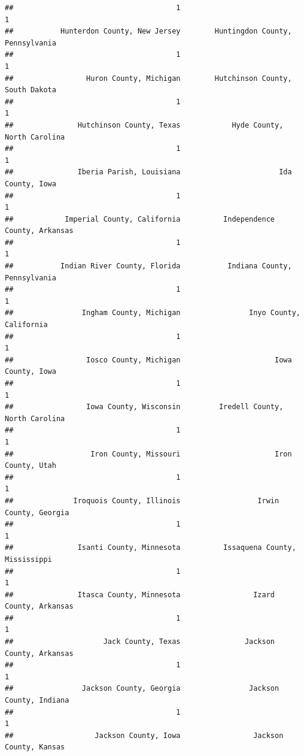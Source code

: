 \documentclass[
]{article}
\begin{document}
\begin{verbatim}
##                                      1                                      1 
##           Hunterdon County, New Jersey        Huntingdon County, Pennsylvania 
##                                      1                                      1 
##                 Huron County, Michigan        Hutchinson County, South Dakota 
##                                      1                                      1 
##               Hutchinson County, Texas            Hyde County, North Carolina 
##                                      1                                      1 
##               Iberia Parish, Louisiana                       Ida County, Iowa 
##                                      1                                      1 
##            Imperial County, California          Independence County, Arkansas 
##                                      1                                      1 
##           Indian River County, Florida           Indiana County, Pennsylvania 
##                                      1                                      1 
##                Ingham County, Michigan                Inyo County, California 
##                                      1                                      1 
##                 Iosco County, Michigan                      Iowa County, Iowa 
##                                      1                                      1 
##                 Iowa County, Wisconsin         Iredell County, North Carolina 
##                                      1                                      1 
##                  Iron County, Missouri                      Iron County, Utah 
##                                      1                                      1 
##              Iroquois County, Illinois                  Irwin County, Georgia 
##                                      1                                      1 
##               Isanti County, Minnesota          Issaquena County, Mississippi 
##                                      1                                      1 
##               Itasca County, Minnesota                 Izard County, Arkansas 
##                                      1                                      1 
##                     Jack County, Texas               Jackson County, Arkansas 
##                                      1                                      1 
##                Jackson County, Georgia                Jackson County, Indiana 
##                                      1                                      1 
##                   Jackson County, Iowa                 Jackson County, Kansas 

\end{verbatim}
\end{document}
